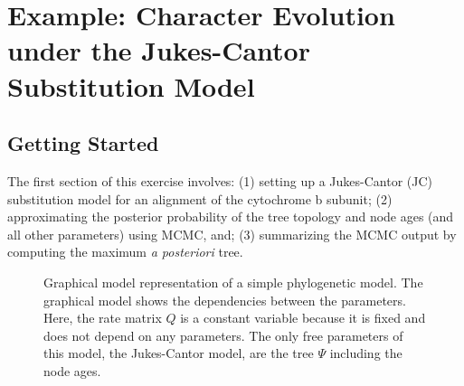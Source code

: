 \section{Example: Character Evolution under the Jukes-Cantor Substitution Model}

\bigskip
\subsection{Getting Started}

The first section of this exercise involves:
(1) setting up a Jukes-Cantor (JC) substitution model for an alignment of the cytochrome b subunit;
(2) approximating the posterior probability of the tree topology and node ages (and all other parameters) using MCMC, and; 
(3) summarizing the MCMC output by computing the maximum \textit{a posteriori} tree. 

\begin{figure}[h!]
\centering
{}
\caption{\small Graphical model representation of a simple phylogenetic model. 
The graphical model shows the dependencies between the parameters.
Here, the rate matrix $Q$ is a constant variable because it is fixed and does not depend on any parameters.
The only free parameters of this model, the Jukes-Cantor model, are the tree $\Psi$ including the node ages.}
\label{fig:jc}
\end{figure}

